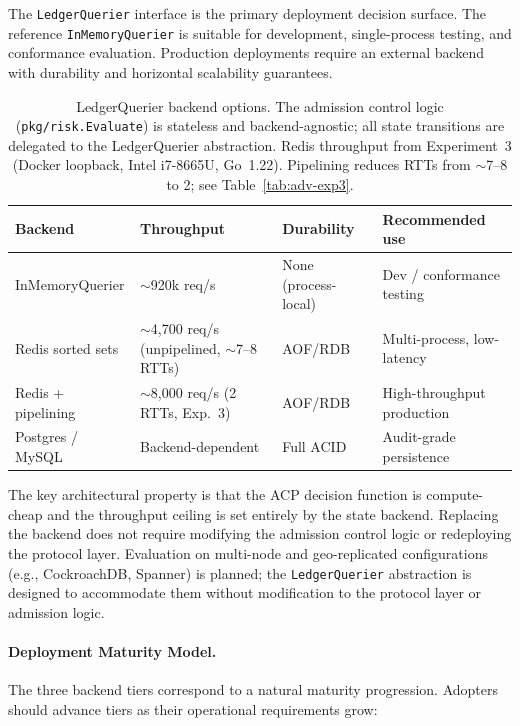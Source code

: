 \documentclass[11pt]{article}
\theoremstyle{definition}
\begin{document}
The \texttt{LedgerQuerier} interface is the primary deployment decision surface.
The reference \texttt{InMemoryQuerier} is suitable for development, single-process
testing, and conformance evaluation.
Production deployments require an external backend with durability and horizontal
scalability guarantees.

\begin{table}[h!]
\centering\small
\begin{tabular}{llll}
\toprule
Backend & Throughput & Durability & Recommended use \\
\midrule
InMemoryQuerier   & $\sim$920k req/s  & None (process-local) & Dev / conformance testing \\
Redis sorted sets & $\sim$4{,}700 req/s (unpipelined, $\sim$7--8 RTTs) & AOF/RDB & Multi-process, low-latency \\
Redis + pipelining & $\sim$8{,}000 req/s (2 RTTs, Exp.~3) & AOF/RDB & High-throughput production \\
Postgres / MySQL  & Backend-dependent & Full ACID & Audit-grade persistence \\
\bottomrule
\end{tabular}
\caption{LedgerQuerier backend options.
The admission control logic (\texttt{pkg/risk.Evaluate}) is stateless and backend-agnostic;
all state transitions are delegated to the LedgerQuerier abstraction.
Redis throughput from Experiment~3 (Docker loopback, Intel i7-8665U, Go~1.22).
Pipelining reduces RTTs from $\sim$7--8 to 2; see Table~\ref{tab:adv-exp3}.}
\label{tab:backends}
\end{table}

The key architectural property is that the ACP decision function is compute-cheap
and the throughput ceiling is set entirely by the state backend.
Replacing the backend does not require modifying the admission control logic
or redeploying the protocol layer.
Evaluation on multi-node and geo-replicated configurations (e.g., CockroachDB, Spanner)
is planned; the \texttt{LedgerQuerier} abstraction is designed to accommodate them without
modification to the protocol layer or admission logic.

\paragraph{Deployment Maturity Model.}
The three backend tiers correspond to a natural maturity progression.
Adopters should advance tiers as their operational requirements grow:
\end{document}
